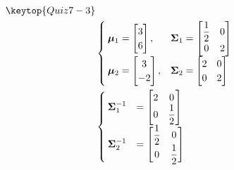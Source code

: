 \documentclass[12pt,a4j,dvipdfmx]{jarticle}
\begin{document}
\begin{minipage}{0.5\hsize}
\begin{align*}
\keytop{Quiz7-3} &\\
&
\begin{cases}
    \bm{\mu}_1 = \begin{bmatrix} 3 \\ 6 \end{bmatrix}, &
    \bm{\Sigma}_1 = \begin{bmatrix} \displaystyle\frac{1}{2}&0 \\ 0&2 \end{bmatrix}\\
    \bm{\mu}_2 = \begin{bmatrix} 3 \\ -2 \end{bmatrix},&
    \bm{\Sigma}_2 = \begin{bmatrix} 2&0 \\ 0&2 \end{bmatrix}
\end{cases} \\
&
\begin{cases}
\bm{\Sigma}_1^{-1} &= \begin{bmatrix} 2&0 \\ 0&\displaystyle\frac{1}{2} \end{bmatrix} \\
\bm{\Sigma}_2^{-1} &= \begin{bmatrix} \displaystyle\frac{1}{2}&0 \\ 0&\displaystyle\frac{1}{2} \end{bmatrix}
\end{cases}
\end{align*}
\end{minipage}
\end{document}

